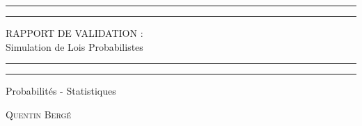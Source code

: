 \documentclass[a4paper,oneside]{article}
\begin{document}


\begin{titlepage} %

	\centering %

	\scshape %

	\vspace*{\baselineskip} %


	\rule{\textwidth}{1.6pt}\vspace*{-\baselineskip}\vspace*{2pt}
	\rule{\textwidth}{0.4pt} %

	\vspace{0.75\baselineskip} %

	{\LARGE RAPPORT DE VALIDATION :\\
	\vspace{0.75\baselineskip}
	Simulation de Lois Probabilistes \\
	} %

	\vspace{1\baselineskip} %
	\rule{\textwidth}{0.4pt}\vspace*{-\baselineskip}\vspace*{3.2pt}
	\rule{\textwidth}{1.6pt} %
	\vspace{2\baselineskip} %


	Probabilités - Statistiques

	\vspace*{3\baselineskip} %



	\vspace{0.5\baselineskip} %

	{\scshape\Large Quentin Bergé \\} %


\end{titlepage}
\end{document}
